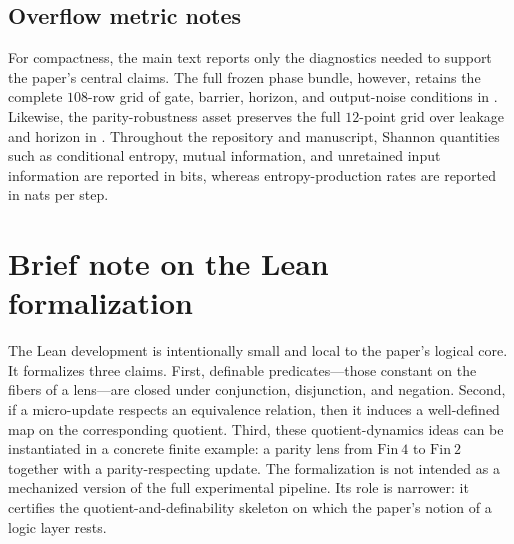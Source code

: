 \documentclass[11pt]{article}
\theoremstyle{definition}
\begin{document}
\subsection{Overflow metric notes}
For compactness, the main text reports only the diagnostics needed to support the paper's central claims. The full frozen phase bundle, however, retains the complete \(108\)-row grid of gate, barrier, horizon, and output-noise conditions in . Likewise, the parity-robustness asset preserves the full \(12\)-point grid over leakage and horizon in . Throughout the repository and manuscript, Shannon quantities such as conditional entropy, mutual information, and unretained input information are reported in bits, whereas entropy-production rates are reported in nats per step.

\section{Brief note on the Lean formalization}
\label{sec:appendix-lean}

The Lean development is intentionally small and local to the paper's logical core. It formalizes three claims. First, definable predicates---those constant on the fibers of a lens---are closed under conjunction, disjunction, and negation. Second, if a micro-update respects an equivalence relation, then it induces a well-defined map on the corresponding quotient. Third, these quotient-dynamics ideas can be instantiated in a concrete finite example: a parity lens from \(\mathrm{Fin}\ 4\) to \(\mathrm{Fin}\ 2\) together with a parity-respecting update. The formalization is not intended as a mechanized version of the full experimental pipeline. Its role is narrower: it certifies the quotient-and-definability skeleton on which the paper's notion of a logic layer rests.



 
\end{document}
